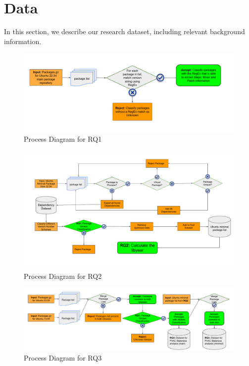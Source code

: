 \documentclass[sn-mathphys-num]{sn-jnl}%
\theoremstyle{thmstyleone}%
\theoremstyle{thmstyletwo}%
\theoremstyle{thmstylethree}%
\begin{document}
\section{Data}
In this section, we describe our research dataset, including relevant background information. 

 \begin{figure}
    \centering
     \includegraphics[width=\columnwidth]{figures/process-diagram-RQ1.pdf}
     \caption{Process Diagram for RQ1}
     \label{fig:process-rq1}
 \end{figure}

 \begin{figure}
    \centering
     \includegraphics[width=\columnwidth]{figures/process-diagram-RQ2.pdf}
     \caption{Process Diagram for RQ2}
     \label{fig:process-rq2}
 \end{figure}


 \begin{figure}
    \centering
     \includegraphics[width=\columnwidth]{figures/process-diagram-RQ3.pdf}
     \caption{Process Diagram for RQ3}
     \label{fig:process-rq3}
 \end{figure}
\end{document}
